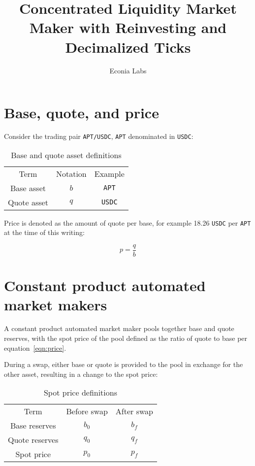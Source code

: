\documentclass[table, twocolumn]{article}
\begin{document}
\title{Concentrated Liquidity Market Maker with Reinvesting and Decimalized Ticks}
\author{Econia Labs}
\date{}

\maketitle

\section{Base, quote, and price}

Consider the trading pair \texttt{APT/USDC}, \texttt{APT} denominated in \texttt{USDC}:

\begin{table}[ht]
  \centering
  \begin{tabular}{|c|c|c|}
    \hline
    \rowcolor{cyan}
    Term        & Notation & Example       \\
    Base asset  & $b$      & \texttt{APT}  \\
    Quote asset & $q$      & \texttt{USDC} \\
    \hline
  \end{tabular}
  \caption{Base and quote asset definitions}
  \label{tab:base-quote-definition}
\end{table}

Price is denoted as the amount of quote per base, for example 18.26 \texttt{USDC} per
\texttt{APT} at the time of this writing:

\begin{equation} \label{eqn:price}
  p = \frac{q}{b}
\end{equation}

\section{Constant product automated market makers}

A constant product automated market maker pools together base and quote reserves, with the spot
price of the pool defined as the ratio of quote to base per equation~\ref{eqn:price}.

During a swap, either base or quote is provided to the pool in exchange for the other asset,
resulting in a change to the spot price:

\begin{table}[ht]
  \centering
  \begin{tabular}{|c|c|c|}
    \hline
    \rowcolor{cyan}
    Term           & Before swap & After swap \\
    Base reserves  & $b_0$       & $b_f$      \\
    Quote reserves & $q_0$       & $q_f$      \\
    Spot price     & $p_0$       & $p_f$      \\
    \hline
  \end{tabular}
  \caption{Spot price definitions}
  \label{tab:spot-before-after-swap}
\end{table}
\end{document}
